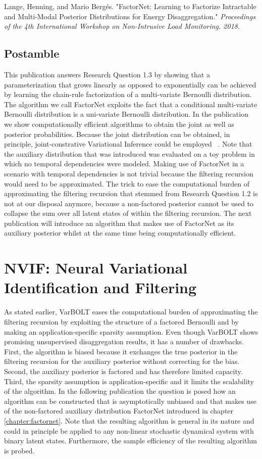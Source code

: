\documentclass[11pt]{cmuthesis} %
\begin{document}
Lange, Henning, and Mario Bergés. "FactorNet: Learning to Factorize Intractable and Multi-Modal Posterior Distributions for Energy Disaggregation." \emph{Proceedings of the 4th International Workshop on Non-Intrusive Load Monitoring. 2018.}


\newpage
\section{Postamble}
This publication answers Research Question 1.3 by showing that a parameterization that grows linearly as opposed to exponentially can be achieved by learning the chain-rule factorization of a multi-variate Bernoulli distribution. The algorithm we call FactorNet exploits the fact that a conditional multi-variate Bernoulli distribution is a uni-variate Bernoulli distribution. In the publication we show computationally efficient algorithms to obtain the joint as well as posterior probabilities. Because the joint distribution can be obtained, in principle, joint-constrative Variational Inference could be employed ~\cite{ambrogioni2018wasserstein}. Note that the auxiliary distribution that was introduced was evaluated on a toy problem in which no temporal dependencies were modeled. Making use of FactorNet in a scenario with temporal dependencies is not trivial because the filtering recursion would need to be approximated. The trick to ease the computational burden of approximating the filtering recursion that stemmed from Research Question 1.2 is not at our disposal anymore, because a non-factored posterior cannot be used to collapse the sum over all latent states of within the filtering recursion. The next publication will introduce an algorithm that makes use of FactorNet as its auxiliary posterior whilst at the same time being computationally efficient.

\chapter{NVIF: Neural Variational Identification and Filtering}
\label{chapter:nvif}

As stated earlier, VarBOLT eases the computational burden of approximating the filtering recursion by exploiting the structure of a factored Bernoulli and by making an application-specific sparsity assumption. Even though VarBOLT shows promising unsupervised disaggregation results, it has a number of drawbacks. First, the algorithm is biased because it exchanges the true posterior in the filtering recursion for the auxiliary posterior without correcting for the bias. Second, the auxiliary posterior is factored and has therefore limited capacity. Third, the sparsity assumption is application-specific and it limits the scalability of the algorithm. In the following publication the question is posed how an algorithm can be constructed that is asymptotically unbiased and that makes use of the non-factored auxiliary distribution FactorNet introduced in chapter \ref{chapter:factornet}. Note that the resulting algorithm is general in its nature and could in principle be applied to any non-linear stochastic dynamical system with binary latent states. Furthermore, the sample efficiency of the resulting algorithm is probed.
\end{document}
